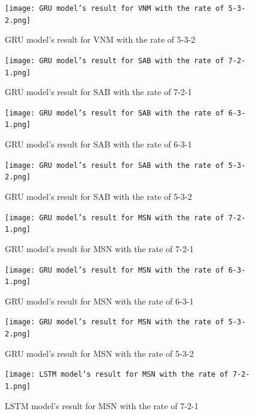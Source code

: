 \documentclass{ieeeojies}
\begin{document}
    \begin{figure}[H]
    
    \begin{minipage}{0.23\textwidth}
    \centering
    \texttt{[image: GRU model’s result for VNM with the rate of 5-3-2.png]}
    \caption{GRU model’s result for VNM with the rate of 5-3-2}
    \end{minipage}   
   \hfill
    \centering
    \begin{minipage}{0.23\textwidth}
    \centering
    \texttt{[image: GRU model’s result for SAB with the rate of 7-2-1.png]}
    \caption{GRU model’s result for SAB with the rate of 7-2-1}
    \end{minipage}
     \end{figure}
     
     \begin{figure}[H]
    \begin{minipage}{0.23\textwidth}
    \centering
    \texttt{[image: GRU model’s result for SAB with the rate of 6-3-1.png]}
    \caption{GRU model’s result for SAB with the rate of 6-3-1}
    \end{minipage}
    \hfill
    \begin{minipage}{0.23\textwidth}
    \centering
    \texttt{[image: GRU model’s result for SAB with the rate of 5-3-2.png]}
    \caption{GRU model’s result for SAB with the rate of 5-3-2}
    \end{minipage}
    \end{figure}
    \begin{figure}[H]
    \begin{minipage}{0.23\textwidth}
    \centering
    \texttt{[image: GRU model’s result for MSN with the rate of 7-2-1.png]}
    \caption{GRU model’s result for MSN with the rate of 7-2-1}
    \end{minipage}   
    \hfill
    \begin{minipage}{0.23\textwidth}
    \centering
    \texttt{[image: GRU model’s result for MSN with the rate of 6-3-1.png]}
    \caption{GRU model’s result for MSN with the rate of 6-3-1}
    \end{minipage}
    \end{figure}
    
   \begin{figure}[H]

    \begin{minipage}{0.23\textwidth}
    \centering
    \texttt{[image: GRU model’s result for MSN with the rate of 5-3-2.png]}
    \caption{GRU model’s result for MSN with the rate of 5-3-2}
    \end{minipage}
    \hfill
    \begin{minipage}{0.23\textwidth}
    \centering
    \texttt{[image: LSTM model’s result for MSN with the rate of 7-2-1.png]}
    \caption{LSTM model’s result for MSN with the rate of 7-2-1}
    \end{minipage}
    \end{figure}
    
\end{document}
